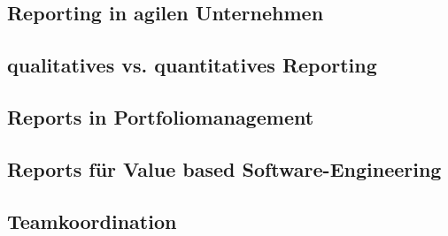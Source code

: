 \subsection{Reporting in agilen Unternehmen}

\subsection{qualitatives vs. quantitatives Reporting}

\subsection{Reports in Portfoliomanagement}

\subsection{Reports für Value based Software-Engineering}

\subsection{Teamkoordination}
